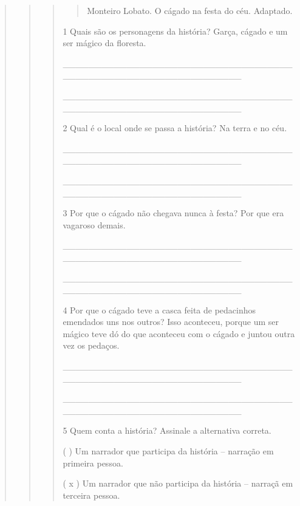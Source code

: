\begin{quote}
\begin{quote}
\begin{quote}
\begin{quote}
\fonte Monteiro Lobato. O cágado na festa do céu. Adaptado.
\end{quote}


\num{1} Quais são os personagens da história? Garça, cágado e um ser mágico da floresta.

\_\_\_\_\_\_\_\_\_\_\_\_\_\_\_\_\_\_\_\_\_\_\_\_\_\_\_\_\_\_\_\_\_\_\_\_\_\_\_\_\_\_\_\_\_\_\_\_\_\_\_\_\_\_\_\_\_\_\_\_\_\_\_\_

\_\_\_\_\_\_\_\_\_\_\_\_\_\_\_\_\_\_\_\_\_\_\_\_\_\_\_\_\_\_\_\_\_\_\_\_\_\_\_\_\_\_\_\_\_\_\_\_\_\_\_\_\_\_\_\_\_\_\_\_\_\_\_\_

\num{2} Qual é o local onde se passa a história? Na terra e no céu.

\_\_\_\_\_\_\_\_\_\_\_\_\_\_\_\_\_\_\_\_\_\_\_\_\_\_\_\_\_\_\_\_\_\_\_\_\_\_\_\_\_\_\_\_\_\_\_\_\_\_\_\_\_\_\_\_\_\_\_\_\_\_\_\_

\_\_\_\_\_\_\_\_\_\_\_\_\_\_\_\_\_\_\_\_\_\_\_\_\_\_\_\_\_\_\_\_\_\_\_\_\_\_\_\_\_\_\_\_\_\_\_\_\_\_\_\_\_\_\_\_\_\_\_\_\_\_\_\_

\num{3} Por que o cágado não chegava nunca à festa? Por que era vagaroso
demais.

\protect\hypertarget{_Hlk127856302}{}{}\_\_\_\_\_\_\_\_\_\_\_\_\_\_\_\_\_\_\_\_\_\_\_\_\_\_\_\_\_\_\_\_\_\_\_\_\_\_\_\_\_\_\_\_\_\_\_\_\_\_\_\_\_\_\_\_\_\_\_\_\_\_\_\_

\_\_\_\_\_\_\_\_\_\_\_\_\_\_\_\_\_\_\_\_\_\_\_\_\_\_\_\_\_\_\_\_\_\_\_\_\_\_\_\_\_\_\_\_\_\_\_\_\_\_\_\_\_\_\_\_\_\_\_\_\_\_\_\_

\num{4} Por que o cágado teve a casca feita de pedacinhos emendados uns nos
outros? Isso aconteceu, porque um ser mágico teve dó do que aconteceu com o cágado e juntou outra
vez os pedaços.

\_\_\_\_\_\_\_\_\_\_\_\_\_\_\_\_\_\_\_\_\_\_\_\_\_\_\_\_\_\_\_\_\_\_\_\_\_\_\_\_\_\_\_\_\_\_\_\_\_\_\_\_\_\_\_\_\_\_\_\_\_\_\_\_

\_\_\_\_\_\_\_\_\_\_\_\_\_\_\_\_\_\_\_\_\_\_\_\_\_\_\_\_\_\_\_\_\_\_\_\_\_\_\_\_\_\_\_\_\_\_\_\_\_\_\_\_\_\_\_\_\_\_\_\_\_\_\_\_

\num{5} Quem conta a história? Assinale a alternativa correta.

( ) Um narrador que participa da história -- narração em primeira pessoa.

( x ) Um narrador que não participa da história -- narraçã em terceira pessoa.


\end{quote}
\end{quote}
\end{quote}
